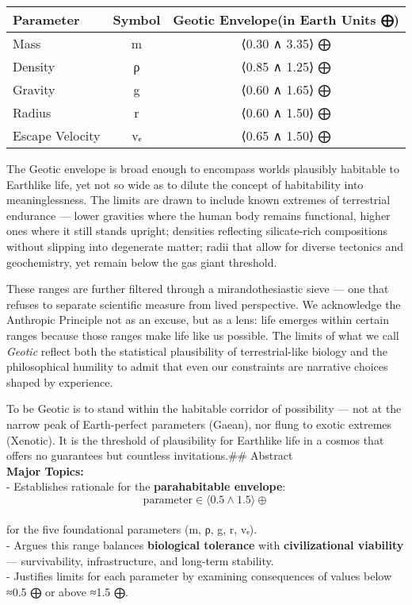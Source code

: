 \documentclass[
  letterpaper,
]{book}
\begin{document}
\begin{longtable}[]{@{}lcc@{}}
\toprule\noalign{}
Parameter & Symbol & Geotic Envelope(in Earth Units ⨁) \\
\midrule\noalign{}
\endhead
\bottomrule\noalign{}
\endlastfoot
Mass & m & ⟨0.30 ∧ 3.35⟩ ⨁ \\
Density & ρ & ⟨0.85 ∧ 1.25⟩ ⨁ \\
Gravity & g & ⟨0.60 ∧ 1.65⟩ ⨁ \\
Radius & r & ⟨0.60 ∧ 1.50⟩ ⨁ \\
Escape Velocity & vₑ & ⟨0.65 ∧ 1.50⟩ ⨁ \\
\end{longtable}

The Geotic envelope is broad enough to encompass worlds plausibly
habitable to Earthlike life, yet not so wide as to dilute the concept of
habitability into meaninglessness. The limits are drawn to include known
extremes of terrestrial endurance --- lower gravities where the human
body remains functional, higher ones where it still stands upright;
densities reflecting silicate-rich compositions without slipping into
degenerate matter; radii that allow for diverse tectonics and
geochemistry, yet remain below the gas giant threshold.

These ranges are further filtered through a mirandothesiastic sieve ---
one that refuses to separate scientific measure from lived perspective.
We acknowledge the Anthropic Principle not as an excuse, but as a lens:
life emerges within certain ranges because those ranges make life like
us possible. The limits of what we call \emph{Geotic} reflect both the
statistical plausibility of terrestrial-like biology and the
philosophical humility to admit that even our constraints are narrative
choices shaped by experience.

To be Geotic is to stand within the habitable corridor of possibility
--- not at the narrow peak of Earth-perfect parameters (Gaean), nor
flung to exotic extremes (Xenotic). It is the threshold of plausibility
for Earthlike life in a cosmos that offers no guarantees but countless
invitations.\#\# Abstract\\
\textbf{Major Topics:}\\
- Establishes rationale for the \textbf{parahabitable envelope}:\\
\[
  \text{parameter} \in \langle0.5 \wedge 1.5\rangle \oplus
  \]\\
for the five foundational parameters (m, ρ, g, r, vₑ).\\
- Argues this range balances \textbf{biological tolerance} with
\textbf{civilizational viability} --- survivability, infrastructure, and
long-term stability.\\
- Justifies limits for each parameter by examining consequences of
values below ≈0.5 ⨁ or above ≈1.5 ⨁.
\end{document}
